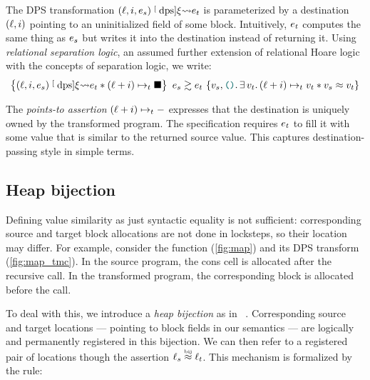 The DPS transformation $(\datalangLoc, \datalangIdx, \datalangExpr_s) \tmcDps{\datalangRenaming} \datalangExpr_t$ is parameterized by a destination $(\datalangLoc, \datalangIdx)$ pointing to an uninitialized field of some block.
Intuitively, $\datalangExpr_t$ computes the same thing as $\datalangExpr_s$ but writes it into the destination instead of returning it.
Using \emph{relational separation logic}, an assumed further extension of relational Hoare logic with the concepts of separation logic, we write:
\[
    \iSimvHoare{
        (\datalangLoc, \datalangIdx, \datalangExpr_s) \tmcDps{\datalangRenaming} \datalangExpr_t \iSep
        (\datalangLoc + \datalangIdx) \iPointsto_t \datalangHole
    }{
        \datalangVal_s, \datalangUnit \ldotp
        \exists \datalangVal_t \ldotp
        (\datalangLoc + \datalangIdx) \iPointsto_t \datalangVal_t \iSep
        \datalangVal_s \iSimilar \datalangVal_t
    }{
        \datalangExpr_s
    }{
        \datalangExpr_t
    }
\]

The \emph{points-to assertion} $(\datalangLoc + \datalangIdx) \iPointsto_t -$ expresses that the destination is uniquely owned by the transformed program.
The specification requires $\datalangExpr_t$ to fill it with some value that is similar to the returned source value.
This captures destination-passing style in simple terms.

\subsection{Heap bijection}

Defining value similarity as just syntactic equality is not sufficient: corresponding source and target block allocations are not done in locksteps, so their location may differ.
For example, consider the  function (\cref{fig:map}) and its DPS transform (\cref{fig:map_tmc}).
In the source program, the cons cell  is allocated after the recursive call.
In the transformed program, the corresponding block is allocated before the call.

To deal with this, we introduce a \emph{heap bijection} as in \Simuliris~\citep*{simuliris-2022}.
Corresponding source and target locations --- pointing to block fields in our semantics --- are logically and permanently registered in this bijection. 
We can then refer to a registered pair of locations though the assertion $\datalangLoc_s \iInBij \datalangLoc_t$.
This mechanism is formalized by the  rule:

